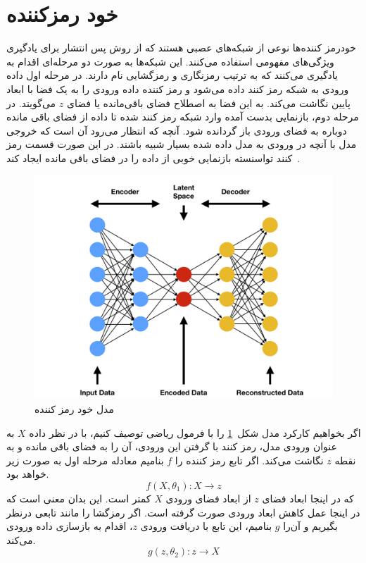 \documentclass[12pt,a4paper]{report}
\theoremstyle{definition}
\theoremstyle{definition}
\begin{document}
	\section{خود رمزکننده}
	خودرمز کننده‌ها نوعی از شبکه‌های عصبی هستند که از روش پس انتشار برای یادگیری ویژگی‌های مفهومی استفاده می‌کنند. این شبکه‌ها به صورت دو مرحله‌ای اقدام به یادگیری می‌کنند که به ترتیب رمزنگاری و رمزگشایی نام دارند. در مرحله اول داده ورودی به شبکه رمز کنند داده می‌شود و رمز کننده داده ورودی را به یک فضا با ابعاد پایین نگاشت می‌کند. به این فضا به اصطلاح فضای باقی‌مانده یا فضای $z$ می‌گویند. در مرحله دوم، بازنمایی بدست آمده وارد شبکه رمز کنند شده تا داده از فضای باقی مانده دوباره به فضای ورودی باز گردانده شود. آنچه که انتظار می‌رود آن است که خروجی مدل با آنچه در ورودی به مدل داده شده بسیار شبیه باشند. در این صورت قسمت رمز کنند تواسنسته بازنمایی خوبی از داده را در فضای باقی مانده ایجاد کند~\cite{BHUVANESHWARI2021131}.
\begin{figure}[!h]
	\begin{center}
		\includegraphics[width=0.6\linewidth]{./images/figures/ae.png}
	\end{center}
	\caption{مدل خود رمز کننده}
	\label{fig:ae}
	\centering
\end{figure}

اگر بخواهیم کارکرد مدل شکل~\ref{fig:ae} را با فرمول ریاضی توصیف کنیم، با در نظر داده $X$ به عنوان ورودی مدل، رمز کنند با گرفتن این ورودی، آن را به فضای باقی مانده و به نقطه $z$ نگاشت می‌کند. اگر تابع رمز کننده را $f$ بنامیم معادله مرحله اول به صورت زیر خواهد بود.
\begin{equation}
f(X, \theta_1): X \rightarrow z
\end{equation}
که در اینجا ابعاد فضای $z$ از ابعاد فضای ورودی $X$ کمتر است. این بدان معنی است که در اینجا عمل کاهش ابعاد ورودی صورت گرفته است. اگر رمزگشا را مانند تابعی درنظر بگیریم و آن‌را $g$ بنامیم، این تابع با دریافت ورودی $z$، اقدام به بازسازی داده ورودی می‌کند.
\begin{equation}
	g(z, \theta_2): z \rightarrow X
\end{equation}
\end{document}
